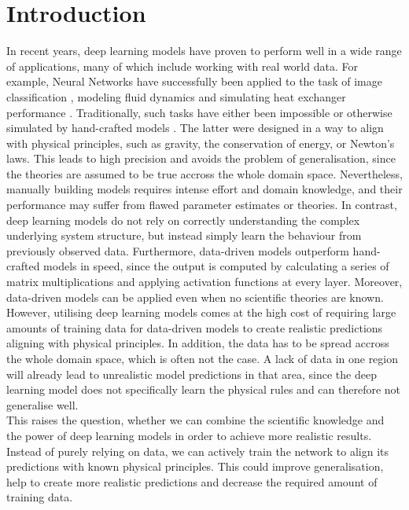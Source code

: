 \label{section:introduction}
\section{Introduction}

In recent years, deep learning models have proven to perform well in a wide range of applications, many of which include working with real world data. For example, Neural Networks have successfully been applied to the task of image classification \cite{NIPS2012_4824}, modeling fluid dynamics \cite{DBLP:journals/corr/SinghMD16, Tompson:2017:AEF:3305890.3306035} and simulating heat exchanger performance \cite{doi:10.1080/10789669.1999.10391233}. Traditionally, such tasks have either been impossible or otherwise simulated by hand-crafted models \cite{Cursi2005PhysicallyCN}. The latter were designed in a way to align with physical principles, such as gravity, the conservation of energy, or Newton's laws. This leads to high precision and avoids the problem of generalisation, since the theories are assumed to be true accross the whole domain space. Nevertheless, manually building models requires intense effort and domain knowledge, and their performance may suffer from flawed parameter estimates or theories. In contrast, deep learning models do not rely on correctly understanding the complex underlying system structure, but instead simply learn the behaviour from previously observed data. Furthermore, data-driven models outperform hand-crafted models in speed, since the output is computed by calculating a series of matrix multiplications and applying activation functions at every layer. Moreover, data-driven models can be applied even when no scientific theories are known. However, utilising deep learning models comes at the high cost of requiring large amounts of training data for data-driven models to create realistic predictions aligning with physical principles. In addition, the data has to be spread accross the whole domain space, which is often not the case. A lack of data in one region will already lead to unrealistic model predictions in that area, since the deep learning model does not specifically learn the physical rules and can therefore not generalise well.\\
\indent This raises the question, whether we can combine the scientific knowledge and the power of deep learning models in order to achieve more realistic results. Instead of purely relying on data, we can actively train the network to align its predictions with known physical principles. This could improve generalisation, help to create more realistic predictions and decrease the required amount of training data.\\

\clearpage

